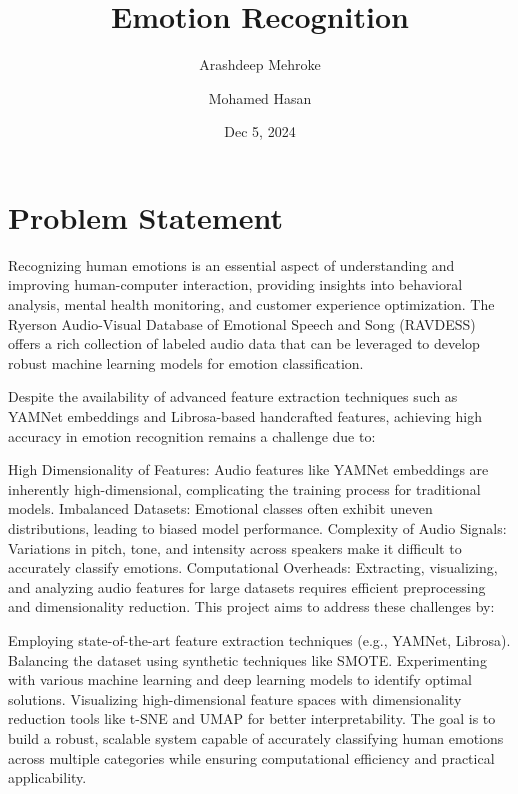 \documentclass{article}
\title{Emotion Recognition}
\author{Arashdeep Mehroke \and Mohamed Hasan}
\date{Dec 5, 2024}
\begin{document}
\maketitle

\section{Problem Statement}


Recognizing human emotions is an essential aspect of understanding and improving human-computer interaction, providing insights into behavioral analysis, mental health monitoring, and customer experience optimization. The Ryerson Audio-Visual Database of Emotional Speech and Song (RAVDESS) offers a rich collection of labeled audio data that can be leveraged to develop robust machine learning models for emotion classification.

Despite the availability of advanced feature extraction techniques such as YAMNet embeddings and Librosa-based handcrafted features, achieving high accuracy in emotion recognition remains a challenge due to:

High Dimensionality of Features: Audio features like YAMNet embeddings are inherently high-dimensional, complicating the training process for traditional models.
Imbalanced Datasets: Emotional classes often exhibit uneven distributions, leading to biased model performance.
Complexity of Audio Signals: Variations in pitch, tone, and intensity across speakers make it difficult to accurately classify emotions.
Computational Overheads: Extracting, visualizing, and analyzing audio features for large datasets requires efficient preprocessing and dimensionality reduction.
This project aims to address these challenges by:

Employing state-of-the-art feature extraction techniques (e.g., YAMNet, Librosa).
Balancing the dataset using synthetic techniques like SMOTE.
Experimenting with various machine learning and deep learning models to identify optimal solutions.
Visualizing high-dimensional feature spaces with dimensionality reduction tools like t-SNE and UMAP for better interpretability.
The goal is to build a robust, scalable system capable of accurately classifying human emotions across multiple categories while ensuring computational efficiency and practical applicability.


\end{document}
